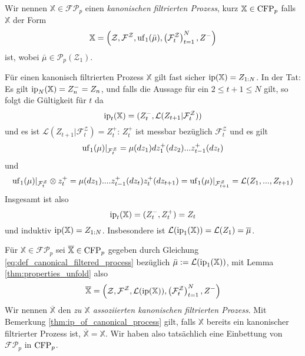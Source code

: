 \begin{definition}
    Wir nennen $\mathbb{X} \in \mathcal{FP}_p$ einen \emph{kanonischen filtrierten Prozess}, kurz $\mathbb{X} \in \operatorname{CFP}_p$ falls $\mathbb{X}$ der Form
    \begin{equation}\label{eq:def_canonical_filtered_process}
    \mathbb{X} = \left( \mathcal{Z}, \mathcal{F}^\mathcal{Z}, \operatorname{uf}_1(\bar{\mu}), \left(\mathcal{F}_t^\mathcal{Z}\right)_{t=1}^N, Z^-\right)
    \end{equation}
    ist, wobei $\bar{\mu} \in \mathcal{P}_p(\mathcal{Z}_1)$.
\end{definition}
\begin{remark}\label{thm:ip_of_canonical_process}
    Für einen kanonisch filtrierten Prozess $\mathbb{X}$ gilt fast sicher $\operatorname{ip}(\mathbb{X}) = Z_{1:N}$. In der Tat: Es gilt $\operatorname{ip}_N(\mathbb{X}) = Z_n^- = Z_n$, und falls die Aussage für ein $2\leq t+1 \leq N$ gilt, so folgt die Gültigkeit für $t$ da 
    $$\operatorname{ip}_t(\mathbb{X}) = (Z_t^-, \mathcal{L}(Z_{t+1} \vert \mathcal{F}_t^\mathcal{Z}))$$
    und es ist $\mathcal{L}(Z_{t+1} \vert \mathcal{F}_t^\mathcal{Z}) = Z_t^+$: $Z_t^+$ ist messbar bezüglich $\mathcal{F}_t^\mathcal{Z}$ und es gilt 
    $$\operatorname{uf}_1(\mu) \vert_{\mathcal{F}_t^\mathcal{Z}} = \mu(dz_1)dz_1^+(dz_2)...z_{t-1}^+(dz_t)$$
    und 
    $$\operatorname{uf}_1(\mu) \vert_{\mathcal{F}_t^\mathcal{Z}} \otimes z_t^+ = \mu(dz_1)....z_{t-1}^+(dz_t)z_t^+(dz_{t+1}) = \operatorname{uf}_1(\mu)\vert_{\mathcal{F}_{t+1}^\mathcal{Z}} = \mathcal{L}(Z_1,...,Z_{t+1})$$
    Insgesamt ist also 
    $$\operatorname{ip}_t(\mathbb{X}) = (Z_t^-, Z_t^+) = Z_t$$
    und induktiv $\operatorname{ip}(\mathbb{X}) = Z_{1:N}$.
    Insbesondere ist $\mathcal{L}(\operatorname{ip}_1(\mathbb{X})) = \mathcal{L}(Z_1) = \overline{\mu}$.
\end{remark}
\begin{definition}
    Für $\mathbb{X} \in \mathcal{FP}_p$ sei $\overline{\mathbb{X}} \in \operatorname{CFP}_p$ gegeben durch Gleichung \ref{eq:def_canonical_filtered_process} bezüglich $\bar\mu := \mathcal{L}(\operatorname{ip}_1(\mathbb{X}))$, mit Lemma \ref{thm:properties_unfold} also
    \begin{equation}\label{eq:associated_process}
        \overline{\mathbb{X}} = \left( \mathcal{Z}, \mathcal{F}^\mathcal{Z}, \mathcal{L}(\operatorname{ip}(\mathbb{X})), \left(\mathcal{F}_t^\mathcal{Z}\right)_{t=1}^N, Z^-\right)
    \end{equation}
    Wir nennen $\overline{\mathbb{X}}$ den \emph{zu $\mathbb{X}$ assoziierten kanonischen filtrierten Prozess}. Mit Bemerkung \ref{thm:ip_of_canonical_process} gilt, falls $\mathbb{X}$ bereits ein kanonischer filtrierter Prozess ist, $\overline{\mathbb{X}} = \mathbb{X}$. Wir haben also tatsächlich eine Einbettung von $\mathcal{FP}_p$ in $\operatorname{CFP}_p$.
\end{definition}

